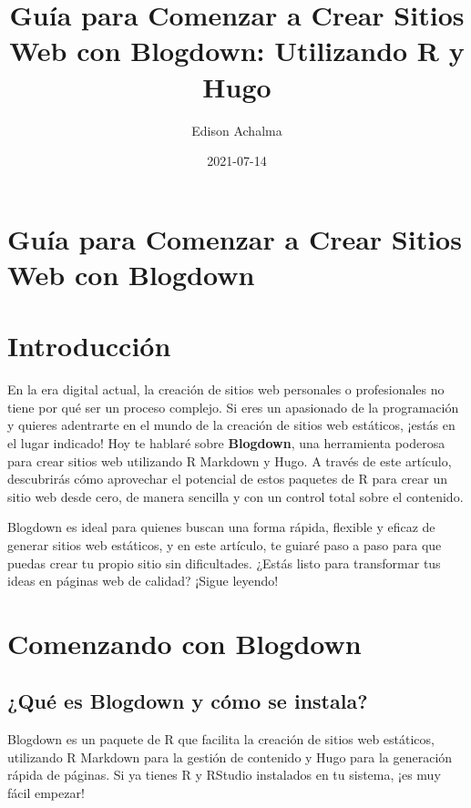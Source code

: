 \documentclass[
  doc,
  floatsintext,
  longtable,
  a4paper,
  nolmodern,
  notxfonts,
  notimes,
  colorlinks=true,linkcolor=blue,citecolor=blue,urlcolor=blue]{apa7}
\title{Guía para Comenzar a Crear Sitios Web con Blogdown: Utilizando R
y Hugo}
\author{Edison Achalma}
\affiliation{
{Departamento de Economía, Universidad Nacional de San Cristóbal de
Huamanga}}
\date{2021-07-14}
\begin{document}
\maketitle

\hypertarget{toc}{}
\tableofcontents
\newpage
\section[Introduction]{Guía para Comenzar a Crear Sitios Web con
Blogdown}

\setcounter{secnumdepth}{-\maxdimen} %

\setlength\LTleft{0pt}


\section{Introducción}\label{introducciuxf3n}

En la era digital actual, la creación de sitios web personales o
profesionales no tiene por qué ser un proceso complejo. Si eres un
apasionado de la programación y quieres adentrarte en el mundo de la
creación de sitios web estáticos, ¡estás en el lugar indicado! Hoy te
hablaré sobre \textbf{Blogdown}, una herramienta poderosa para crear
sitios web utilizando R Markdown y Hugo. A través de este artículo,
descubrirás cómo aprovechar el potencial de estos paquetes de R para
crear un sitio web desde cero, de manera sencilla y con un control total
sobre el contenido.

Blogdown es ideal para quienes buscan una forma rápida, flexible y
eficaz de generar sitios web estáticos, y en este artículo, te guiaré
paso a paso para que puedas crear tu propio sitio sin dificultades.
¿Estás listo para transformar tus ideas en páginas web de calidad?
¡Sigue leyendo!

\section{Comenzando con Blogdown}\label{comenzando-con-blogdown}

\subsection{¿Qué es Blogdown y cómo se
instala?}\label{quuxe9-es-blogdown-y-cuxf3mo-se-instala}

Blogdown es un paquete de R que facilita la creación de sitios web
estáticos, utilizando R Markdown para la gestión de contenido y Hugo
para la generación rápida de páginas. Si ya tienes R y RStudio
instalados en tu sistema, ¡es muy fácil empezar!
\end{document}
